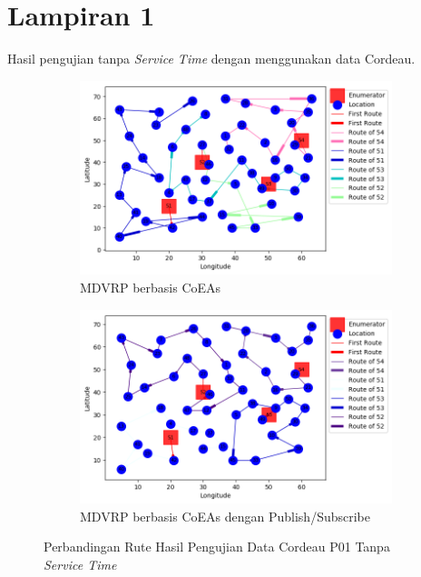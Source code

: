 \chapter*{Lampiran 1}
\label{ch:test_result_cordeau_notw}


Hasil pengujian tanpa \textit{Service Time} dengan menggunakan data Cordeau.


\begin{figure}[!]
	\centering
	\begin{subfigure}[t]{\textwidth}
		\centering
		\includegraphics[width=\textwidth]{Resources/Images/test_result_cordeau_p01_notw_coes}
		\caption{MDVRP berbasis CoEAs}
		\label{fig:test_result_cordeau_p01_notw_coes}
	\end{subfigure}%
	
	\begin{subfigure}[t]{\textwidth}
		\centering
		\includegraphics[width=\textwidth]{Resources/Images/test_result_cordeau_p01_notw_pubsub_coes}
		\caption{MDVRP berbasis CoEAs dengan Publish/Subscribe}
		\label{fig:test_result_cordeau_p01_notw_pubsub_coes}
	\end{subfigure}
	\caption{Perbandingan Rute Hasil Pengujian Data Cordeau P01 Tanpa \textit{Service Time}}
	\label{fig:test_result_cordeau_p01_notw}
\end{figure}


